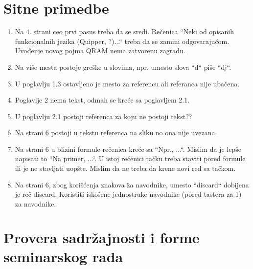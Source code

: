 \documentclass[a4paper]{report}
\begin{document}
\section{Sitne primedbe}
\begin{enumerate}
\item Na 4. strani ceo prvi pasus treba da se sredi.
Rečenica ``Neki od opisanih funkcionalnih jezika (Quipper, ?)...`` treba da se zamini odgovarajućom.
Uvođenje novog pojma QRAM nema zatvorenu zagradu.

\item Na više mesta postoje greške u slovima, npr. umesto slova ``đ`` piše ``dj``.

\item U poglavlju 1.3 ostavljeno je mesto za referencu ali referanca nije ubačena.

\item Poglavlje 2 nema tekst, odmah se kreće sa poglavljem 2.1.

\item U poglavlju 2.1 postoji referenca za koju ne postoji tekst??

\item Na strani 6 postoji u tekstu referenca na sliku no ona nije uvezana.

\item Na strani 6 u blizini formule rečenica kreće sa ``Npr., ...``. Mislim da je lepše napisati to ``Na primer, ...``. U istoj rečenici tačku treba staviti pored formule ili je ne stavljati uopšte. Mislim da ne treba da krene novi red sa tačkom.

\item Na strani 6, zbog korišćenja znakova \" za navodnike, umesto ``discard`` dobijena je reč điscard. Koristiti iskošene jednostruke navodnike (pored tastera za 1) za navodnike.

\end{enumerate}

\section{Provera sadržajnosti i forme seminarskog rada}
\end{document}
